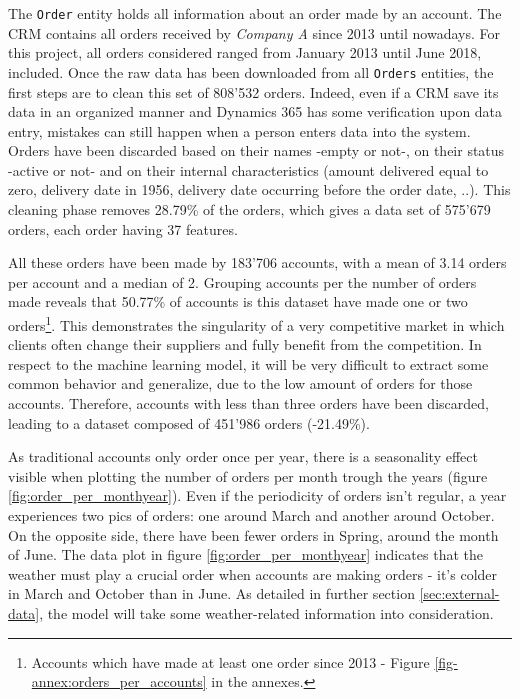 The \texttt{Order} entity holds all information about an order made by an account. The CRM contains all orders received by \textit{Company A} since 2013 until nowadays. For this project, all orders considered ranged from January 2013 until June 2018, included. Once the raw data has been downloaded from all \texttt{Orders} entities, the first steps are to clean this set of 808'532 orders. Indeed, even if a CRM save its data in an organized manner and Dynamics 365 has some verification upon data entry, mistakes can still happen when a person enters data into the system. Orders have been discarded based on their names -empty or not-, on their status -active or not- and on their internal characteristics (amount delivered equal to zero, delivery date in 1956, delivery date occurring before the order date, ..). This cleaning phase removes 28.79\% of the orders, which gives a data set of 575'679 orders, each order having 37 features.

All these orders have been made by 183'706 accounts, with a mean of 3.14 orders per account and a median of 2. Grouping accounts per the number of orders made reveals that 50.77\% of accounts is this dataset have made one or two orders\footnote{Accounts which have made at least one order since 2013 - Figure \ref{fig-annex:orders_per_accounts} in the annexes.}. This demonstrates the singularity of a very competitive market in which clients often change their suppliers and fully benefit from the competition. In respect to the machine learning model, it will be very difficult to extract some common behavior and generalize, due to the low amount of orders for those accounts. Therefore, accounts with less than three orders have been discarded, leading to a dataset composed of 451'986 orders (-21.49\%).

As traditional accounts only order once per year, there is a seasonality effect visible when plotting the number of orders per month trough the years (figure \ref{fig:order_per_monthyear}). Even if the periodicity of orders isn't regular, a year experiences two pics of orders: one around March and another around October. On the opposite side, there have been fewer orders in Spring, around the month of June. The data plot in figure \ref{fig:order_per_monthyear} indicates that the weather must play a crucial order when accounts are making orders - it's colder in March and October than in June. As detailed in further section \ref{sec:external-data}, the model will take some weather-related information into consideration.

